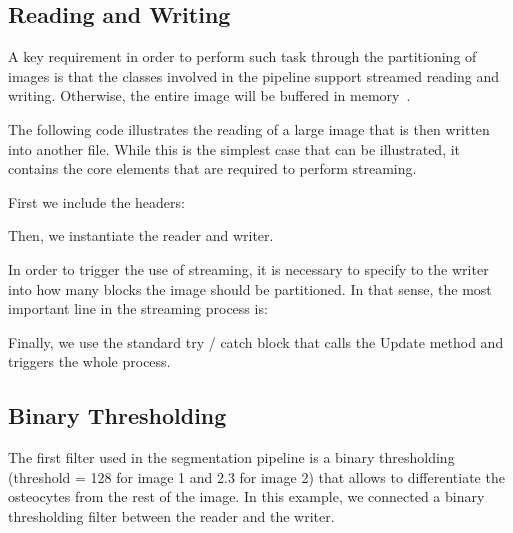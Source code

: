 \documentclass{InsightArticle}
\begin{document}
\subsection{Reading and Writing}
A key requirement in order to perform such task through the partitioning of
images is that the  classes involved in the pipeline support
streamed reading and writing. Otherwise, the entire image will be buffered
in memory~\cite{Lowekamp2010}.

The following code illustrates the reading of a large image that is then written
into another file. While this is the simplest case that can be illustrated, it
contains the core elements that are required to perform streaming.

First we include the headers:

\begin{center}

\end{center}

Then, we instantiate the reader and writer.

\begin{center}

\end{center}

In order to trigger the use of streaming, it is necessary to specify to the
writer into how many blocks the image should be partitioned. In that sense, the
most important line in the streaming process is:

\begin{center}

\end{center}

Finally, we use the standard try / catch block that calls the Update method and
triggers the whole process.

\begin{center}

\end{center}

\subsection{Binary Thresholding}
The first filter used in the segmentation pipeline is a binary thresholding
(threshold = 128 for image 1 and 2.3 for image 2) that
allows to differentiate the osteocytes from the rest of the image. In this example,
we connected a binary thresholding filter between the reader and the writer.
\end{document}
